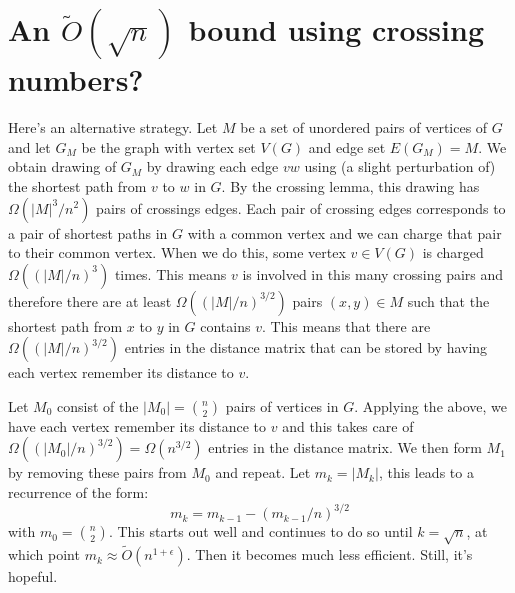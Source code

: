 \documentclass{patmorin}
\DeclareMathOperator{\dist}{dist}
\begin{document}
%

\section{An $\tilde{O}(\sqrt{n})$ bound using crossing numbers?}

Here's an alternative strategy.  Let $M$ be a set of unordered pairs of vertices of $G$ and let $G_M$ be the graph with vertex set $V(G)$ and edge set $E(G_M)=M$.  We obtain drawing of $G_M$ by drawing each edge $vw$ using (a slight perturbation of) the shortest path from $v$ to $w$ in $G$.  By the crossing lemma, this drawing has $\Omega(|M|^3/n^2)$ pairs of crossings edges.  Each pair of crossing edges corresponds to a pair of shortest paths in $G$ with a common vertex and we can charge that pair to their common vertex.  When we do this, some vertex $v\in V(G)$ is charged $\Omega((|M|/n)^3)$ times.  This means $v$ is involved in this many crossing pairs and therefore there are at least $\Omega((|M|/n)^{3/2})$ pairs $(x,y)\in M$ such that the shortest path from $x$ to $y$ in $G$ contains $v$.  This means that there are $\Omega((|M|/n)^{3/2})$ entries in the distance matrix that can be stored by having each vertex remember its distance to $v$.

Let $M_0$ consist of the $|M_0|=\binom{n}{2}$ pairs of vertices in $G$.  Applying the above, we have each vertex remember its distance to $v$ and this takes care of $\Omega((|M_0|/n)^{3/2})=\Omega(n^{3/2})$ entries in the distance matrix.  We then form $M_1$ by removing these pairs from $M_0$ and repeat.  Let $m_k=|M_k|$, this leads to a recurrence of the form:
\[  m_k = m_{k-1} - (m_{k-1}/n)^{3/2} \]
with $m_0=\binom{n}{2}$.  This starts out well and continues to do so until $k=\sqrt{n}$, at which point $m_k\approx \tilde{O}(n^{1+\epsilon})$.  Then it becomes much less efficient.  Still, it's hopeful.
\end{document}
